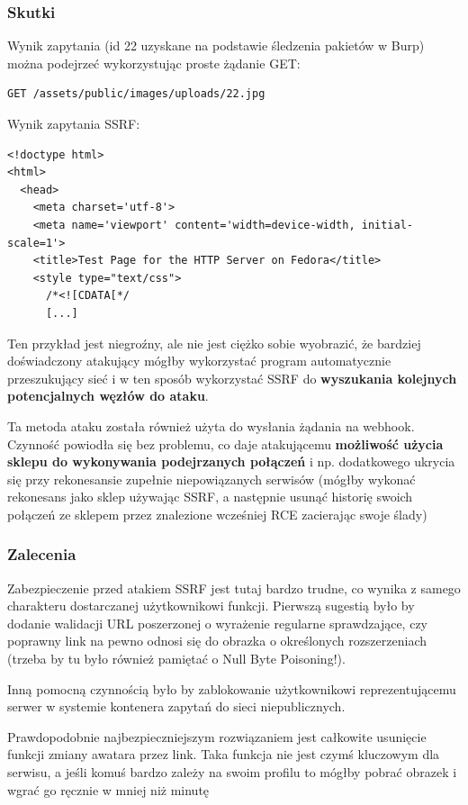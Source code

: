 \subsubsection{Skutki}
Wynik zapytania (id 22 uzyskane na podstawie śledzenia pakietów w Burp) można podejrzeć wykorzystując proste żądanie GET:
\begin{lstlisting}
GET /assets/public/images/uploads/22.jpg
\end{lstlisting}
Wynik zapytania SSRF:
\begin{lstlisting}
<!doctype html>
<html>
  <head>
    <meta charset='utf-8'>
    <meta name='viewport' content='width=device-width, initial-scale=1'>
    <title>Test Page for the HTTP Server on Fedora</title>
    <style type="text/css">
      /*<![CDATA[*/
      [...]
\end{lstlisting}

Ten przykład jest niegroźny, ale nie jest ciężko sobie wyobrazić, że bardziej doświadczony atakujący mógłby wykorzystać program automatycznie przeszukujący sieć i w ten sposób wykorzystać SSRF do \textbf{wyszukania kolejnych potencjalnych węzłów do ataku}.

Ta metoda ataku została również użyta do wysłania żądania na webhook. Czynność powiodła się bez problemu, co daje atakującemu \textbf{możliwość użycia sklepu do wykonywania podejrzanych połączeń} i np. dodatkowego ukrycia się przy rekonesansie zupełnie niepowiązanych serwisów (mógłby wykonać rekonesans jako sklep używając SSRF, a następnie usunąć historię swoich połączeń ze sklepem przez znalezione wcześniej RCE zacierając swoje ślady)

\subsubsection{Zalecenia}
Zabezpieczenie przed atakiem SSRF jest tutaj bardzo trudne, co wynika z samego charakteru dostarczanej użytkownikowi funkcji. Pierwszą sugestią było by dodanie walidacji URL poszerzonej o wyrażenie regularne sprawdzające, czy poprawny link na pewno odnosi się do obrazka o określonych rozszerzeniach (trzeba by tu było również pamiętać o Null Byte Poisoning!).

Inną pomocną czynnością było by zablokowanie użytkownikowi reprezentującemu serwer w systemie kontenera zapytań do sieci niepublicznych.

Prawdopodobnie najbezpieczniejszym rozwiązaniem jest całkowite usunięcie funkcji zmiany awatara przez link. Taka funkcja nie jest czymś kluczowym dla serwisu, a jeśli komuś bardzo zależy na swoim profilu to mógłby pobrać obrazek i wgrać go ręcznie w mniej niż minutę

